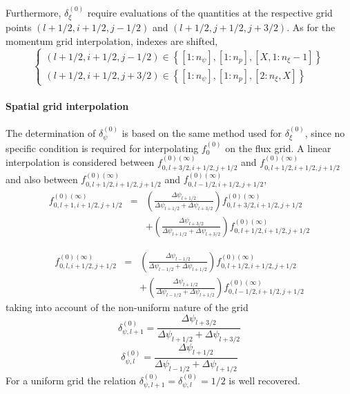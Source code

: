 Furthermore, $\delta _{\xi }^{\left( 0\right) }$ require evaluations of the
quantities at the respective grid points $\left( l+1/2,i+1/2,j-1/2\right) $
and $\left( l+1/2,j+1/2,j+3/2\right) $. As for the momentum grid
interpolation, indexes are shifted,
\begin{equation}
\left\{
\begin{array}{l}
\left( l+1/2,i+1/2,j-1/2\right) \in \left\{ \left[ 1:n_{\psi }\right]
,\left[ 1:n_{p}\right] ,\left[ X,1:n_{\xi }-1\right] \right\} \\
\left( l+1/2,i+1/2,j+3/2\right) \in \left\{ \left[ 1:n_{\psi }\right]
,\left[ 1:n_{p}\right] ,\left[ 2:n_{\xi },X\right] \right\}
\end{array}
\right.
\end{equation}

\paragraph{Spatial grid interpolation}

The determination of $\delta _{\psi }^{\left( 0\right) }$ is based on the
same method used for $\delta _{\xi }^{\left( 0\right) }$, since no specific
condition is required for interpolating $f_{0}^{\left( 0\right) }$ on the
flux grid. A linear interpolation is considered between $%
f_{0,l+3/2,i+1/2,j+1/2}^{\left( 0\right) (\infty )}$ and $%
f_{0,l+1/2,i+1/2,j+1/2}^{\left( 0\right) (\infty )}$ and also between $%
f_{0,l+1/2,i+1/2,j+1/2}^{\left( 0\right) (\infty )}$ and $%
f_{0,l-1/2,i+1/2,j+1/2}^{\left( 0\right) (\infty )}$,
\begin{eqnarray}
f_{0,l+1,i+1/2,j+1/2}^{\left( 0\right) (\infty )} &=&\left( \frac{\Delta
\psi _{l+1/2}}{\Delta \psi _{l+1/2}+\Delta \psi _{l+3/2}}\right)
f_{0,l+3/2,i+1/2,j+1/2}^{\left( 0\right) (\infty )}  \nonumber \\
&&+\left( \frac{\Delta \psi _{l+3/2}}{\Delta \psi _{l+1/2}+\Delta \psi
_{l+3/2}}\right) f_{0,l+1/2,i+1/2,j+1/2}^{\left( 0\right) (\infty )}
\end{eqnarray}

\begin{eqnarray}
f_{0,l,i+1/2,j+1/2}^{\left( 0\right) (\infty )} &=&\left( \frac{\Delta \psi
_{l-1/2}}{\Delta \psi _{l-1/2}+\Delta \psi _{l+1/2}}\right)
f_{0,l+1/2,i+1/2,j+1/2}^{\left( 0\right) (\infty )}  \nonumber \\
&&+\left( \frac{\Delta \psi _{l+1/2}}{\Delta \psi _{l-1/2}+\Delta \psi
_{l+1/2}}\right) f_{0,l-1/2,i+1/2,j+1/2}^{\left( 0\right) (\infty )}
\end{eqnarray}
taking into account of the non-uniform nature of the grid
\begin{equation}
\delta _{\psi ,l+1}^{\left( 0\right) }=\frac{\Delta \psi _{l+3/2}}{\Delta
\psi _{l+1/2}+\Delta \psi _{l+3/2}}
\end{equation}
\begin{equation}
\delta _{\psi ,l}^{\left( 0\right) }=\frac{\Delta \psi _{l+1/2}}{\Delta \psi
_{l-1/2}+\Delta \psi _{l+1/2}}
\end{equation}
For a uniform grid the relation $\delta _{\psi ,l+1}^{\left( 0\right)
}=\delta _{\psi ,l}^{\left( 0\right) }=1/2$ is well recovered.

